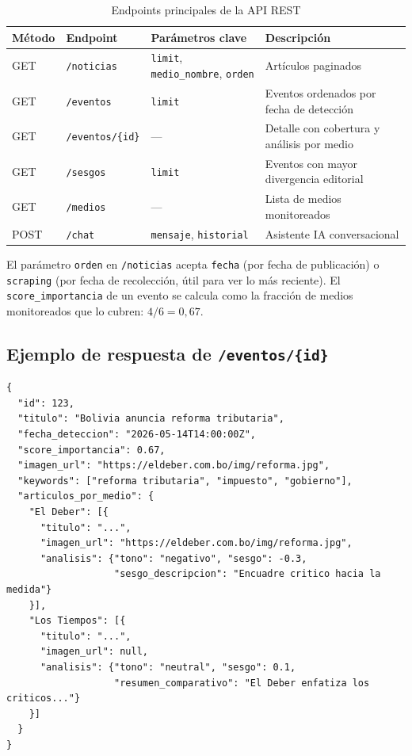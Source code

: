 \documentclass[12pt,a4paper]{article}
\begin{document}
\begin{table}[h]
\centering
\caption{Endpoints principales de la API REST}
\begin{tabular}{@{}llll@{}}
\toprule
\rowcolor{azulAS!15}
\textbf{Método} & \textbf{Endpoint} & \textbf{Parámetros clave} & \textbf{Descripción} \\
\midrule
GET & \texttt{/noticias} & \texttt{limit}, \texttt{medio\_nombre}, \texttt{orden} & Artículos paginados \\
\rowcolor{grisCelda}
GET & \texttt{/eventos} & \texttt{limit} & Eventos ordenados por fecha de detección \\
GET & \texttt{/eventos/\{id\}} & --- & Detalle con cobertura y análisis por medio \\
\rowcolor{grisCelda}
GET & \texttt{/sesgos} & \texttt{limit} & Eventos con mayor divergencia editorial \\
GET & \texttt{/medios} & --- & Lista de medios monitoreados \\
\rowcolor{grisCelda}
POST & \texttt{/chat} & \texttt{mensaje}, \texttt{historial} & Asistente IA conversacional \\
\bottomrule
\end{tabular}
\label{tab:endpoints}
\end{table}

El parámetro \texttt{orden} en \texttt{/noticias} acepta \texttt{fecha} (por fecha de publicación) o \texttt{scraping} (por fecha de recolección, útil para ver lo más reciente). El \texttt{score\_importancia} de un evento se calcula como la fracción de medios monitoreados que lo cubren: $4/6 = 0{,}67$.

\subsection*{Ejemplo de respuesta de \texttt{/eventos/\{id\}}}

\begin{lstlisting}[caption=Respuesta abreviada del endpoint de detalle de evento]
{
  "id": 123,
  "titulo": "Bolivia anuncia reforma tributaria",
  "fecha_deteccion": "2026-05-14T14:00:00Z",
  "score_importancia": 0.67,
  "imagen_url": "https://eldeber.com.bo/img/reforma.jpg",
  "keywords": ["reforma tributaria", "impuesto", "gobierno"],
  "articulos_por_medio": {
    "El Deber": [{
      "titulo": "...",
      "imagen_url": "https://eldeber.com.bo/img/reforma.jpg",
      "analisis": {"tono": "negativo", "sesgo": -0.3,
                   "sesgo_descripcion": "Encuadre critico hacia la medida"}
    }],
    "Los Tiempos": [{
      "titulo": "...",
      "imagen_url": null,
      "analisis": {"tono": "neutral", "sesgo": 0.1,
                   "resumen_comparativo": "El Deber enfatiza los criticos..."}
    }]
  }
}
\end{lstlisting}
\end{document}
